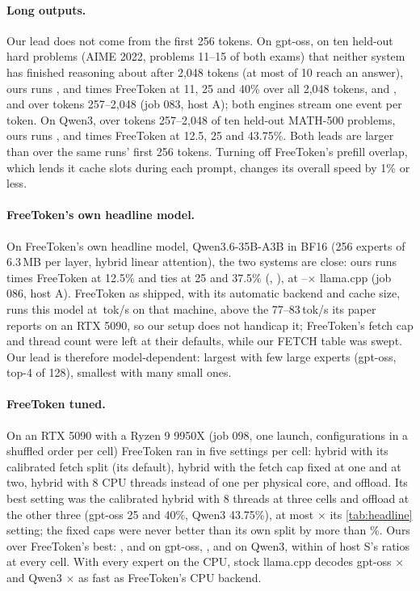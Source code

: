\paragraph{Long outputs.} Our lead does not come from the first 256 tokens. On gpt-oss, on ten held-out hard
problems (AIME 2022, problems 11--15 of both exams) that neither system has finished reasoning about after 2{,}048
tokens (at most \hardAnsMax{} of 10 reach an answer), ours runs \hardAllA, \hardAllB{} and \hardAllC{} times FreeToken
at 11, 25 and 40\% over all 2{,}048 tokens, and \hardLateA, \hardLateB{} and \hardLateC{} over tokens 257--2{,}048
(job 083, host A); both engines stream one event per token. On Qwen3, over tokens 257--2{,}048 of ten held-out
MATH-500 problems, ours runs \longQwenA{}, \longQwenB{} and \longQwenC{} times FreeToken at 12.5, 25 and 43.75\%.
Both leads are larger than over the same runs' first 256 tokens. Turning off FreeToken's prefill overlap, which lends
it cache slots during each prompt, changes its overall speed by 1\% or less.

\paragraph{FreeToken's own headline model.} On FreeToken's own headline model,
Qwen3.6-35B-A3B in BF16 (256 experts of 6.3\,MB per layer, hybrid linear attention), the two systems are close: ours runs
\qsixFtA{} times FreeToken at 12.5\% and ties at 25 and 37.5\% (\qsixFtB, \qsixFtC), at \qsixLlA--\qsixLlC$\times$ llama.cpp (job 086,
host A). FreeToken as shipped, with its automatic backend and cache size, runs this model at \qsixAuto\,tok/s on that
machine, above the 77--83\,tok/s its paper reports on an RTX 5090, so our setup does not handicap it; FreeToken's
fetch cap and thread count were left at their defaults, while our FETCH table was swept. Our lead is therefore
model-dependent: largest with few large experts (gpt-oss, top-4 of 128), smallest with many small ones.

\paragraph{FreeToken tuned.} On an RTX 5090 with a Ryzen 9 9950X (job 098, one launch, configurations in a shuffled
order per cell) FreeToken ran in five settings per cell: hybrid with its calibrated fetch split (its default), hybrid
with the fetch cap fixed at one and at two, hybrid with 8 CPU threads instead of one per physical core, and offload.
Its best setting was the calibrated hybrid with 8 threads at three cells and offload at the other three (gpt-oss 25
and 40\%, Qwen3 43.75\%), at most \fttBestOverDefaultMax$\times$ its \cref{tab:headline} setting; the fixed caps were
never better than its own split by more than \fttCapBestMax\%. Ours over FreeToken's best: \fttGLow, \fttGMid{} and \fttGHigh{} on gpt-oss, \fttQLow, \fttQMid{} and
\fttQHigh{} on Qwen3, within \fttHostSDiffMax{} of host S's ratios at every cell. With every expert on the CPU, stock llama.cpp
decodes gpt-oss \fttCpuGpt$\times$ and Qwen3 \fttCpuQwen$\times$ as fast as FreeToken's CPU backend.

